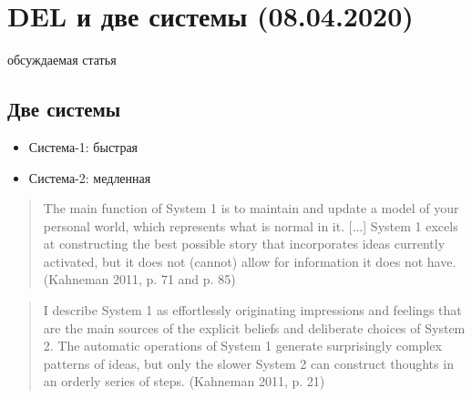 \section{DEL и две системы (08.04.2020)}
обсуждаемая статья \autocite{Solaki2019TheThinking}

\subsection{Две системы}

\begin{itemize}
	\item Система-1: быстрая
	\item Система-2: медленная
\end{itemize}

\begin{quote}
The main function of System 1 is to maintain and update a model of your personal world, which represents what is normal in it. [...] System 1 excels at constructing the best possible story that incorporates ideas currently activated, but it does not (cannot) allow for information it does not have. (Kahneman 2011, p. 71 and p. 85)	
\end{quote}

\begin{quote}
I describe System 1 as effortlessly originating impressions and feelings that are the main sources of the explicit beliefs and deliberate choices of System 2. The automatic operations of System 1 generate surprisingly complex patterns of ideas, but only the slower System 2 can construct thoughts in an orderly series of steps. (Kahneman 2011, p. 21)	
\end{quote}
